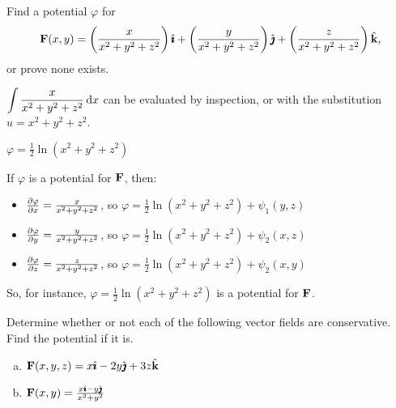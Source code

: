 \begin{question}
Find a potential $\varphi$ for \[\mathbf{F}(x,y)=\left( \frac{x}{x^2+y^2+z^2}\right)\hat{\pmb{\imath}}+\left( \frac{y}{x^2+y^2+z^2}\right)\hat{\pmb{\jmath}}+\left( \frac{z}{x^2+y^2+z^2}\right)\hat{\mathbf{k}},\] or prove none exists. 
\end{question}
\begin{hint}
$\displaystyle\int\frac{x}{x^2+y^2+z^2}\,\mathrm{d}x$ can be evaluated by inspection, or with the substitution \\$u=x^2+y^2+z^2$.
\end{hint}
\begin{answer}
$\varphi = \frac12\ln(x^2+y^2+z^2)$
\end{answer}
\begin{solution}
If $\varphi$ is a potential for $\mathbf{F}$, then:
\begin{itemize}
\item $\pdiff{\varphi}{x}=\frac{x}{x^2+y^2+z^2}$, so $\varphi = \frac12\ln(x^2+y^2+z^2)+\psi_1(y,z)$
\item $\pdiff{\varphi}{y}=\frac{y}{x^2+y^2+z^2}$, so $\varphi = \frac12\ln(x^2+y^2+z^2)+\psi_2(x,z)$
\item $\pdiff{\varphi}{z}=\frac{z}{x^2+y^2+z^2}$, so $\varphi = \frac12\ln(x^2+y^2+z^2)+\psi_2(x,y)$
\end{itemize}
So, for instance, $\varphi= \frac{1}{2}\ln(x^2+y^2+z^2)$ is a potential for $\mathbf{F}$.

\end{solution}

\begin{question}
Determine whether or not each of the following vector
fields are conservative. Find the potential if it is.
\begin{enumerate}[(a)]
\item
   $\mathbf{F}(x,y,z)=x\hat{\pmb{\imath}}-2y\hat{\pmb{\jmath}}+3z\hat{\mathbf{k}}$
\item
   $\mathbf{F}(x,y)=\frac{x\hat{\pmb{\imath}}-y\hat{\pmb{\jmath}}}{x^2+y^2}$
\end{enumerate}
\end{question}


